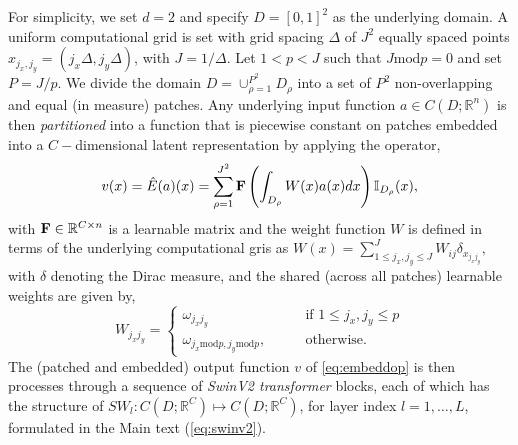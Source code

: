 \documentclass[reqno,10pt]{amsart}
\theoremstyle{plain}
\theoremstyle{definition}
\newcommand{\bb}[1]{\mathbb{#1}}
\begin{document}
\noindent For simplicity, we set $d=2$ and specify $D = [0,1]^2$ as the underlying domain. A uniform computational grid is set with grid spacing $\Delta$ of $J^2$ equally spaced points $x_{j_x,j_y} = (j_x\Delta, j_y\Delta)$, with $J = 1/\Delta$. Let $1<p<J$ such that $J\text{mod}p=0$ and set $P = J/p$. We divide the domain $D = \cup_{\rho=1}^{P^2} D_\rho$ into a set of $P^2$ non-overlapping and equal (in measure) patches. Any underlying input function $a \in C(D;\bb R^n)$ is then {\it partitioned} into a function that is piecewise constant on patches embedded into a $C-$dimensional latent representation by applying the operator,
\begin{equation}\label{eq:embeddop}
    v(x) = \hat{E}(a)(x) = \sum_{\rho=1}^{J^2} {\bf F}\left(\int_{D_\rho} W(x)a(x) dx \right) \bb I_{D_\rho}(x),
\end{equation}
with ${\bf F} \in \bb R^{C\times n}$ is a learnable matrix and the weight function $W$ is defined in terms of the underlying computational gris as $W(x) = \sum_{1 \leq j_x,j_y \leq J}^{J} W_{ij}\delta_{x_{j_xj_y}},$ with $\delta$ denoting the Dirac measure, and the shared (across all patches) learnable weights are given by,
\begin{equation}
    W_{j_xj_y} = \begin{cases}
        \omega_{j_xj_y} \qquad & \text{if } 1 \leq j_x,j_y \leq p \\
        \omega_{j_x\text{mod}p,j_y\text{mod}p}, \qquad & \text{otherwise}.
    \end{cases}
\end{equation}
The (patched and embedded) output function $v$ of \ref{eq:embeddop} is then processes through a sequence of {\it SwinV2 transformer} blocks, each of which has the structure of $SW_l : C(D;\bb R^C) \mapsto C(D;\bb R^C)$, for layer index $l=1, \dots, L$, formulated in the Main text (\ref{eq:swinv2}).
\end{document}
